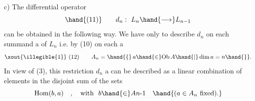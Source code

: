 c) The differential operator
\[ \hand{(11)} \qquad d_n:\ L_n \hand{\longrightarrow} L_{n-1} \]
can be obtained in the following way. We have only to describe $d_n$ on
each summand a of $L_n$ i.e. by (10) on each a  
\[ \xout{\illegible{1}} \ (12) \qquad A_n = \hand{\{}\, a \hand{\in} \mathrm{Ob}\,A \hand{|} \dim a = n \hand{\}}. \]
In view of (3), this restriction $d_n$ \hand{$|$} a can be described as a linear
combination of elements in the disjoint sum of the sets
\[ \mathrm{Hom}(b,a) \quad , \quad \text{with}\ \ b \hand{\in} An\text{-}1 \quad \hand{(a \in A_n\ \text{fixed}).} \]



